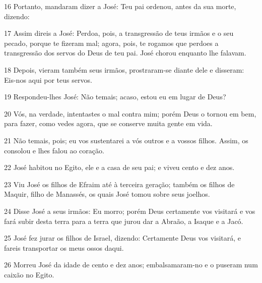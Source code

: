 \par 16 Portanto, mandaram dizer a José: Teu pai ordenou, antes da sua morte, dizendo:
\par 17 Assim direis a José: Perdoa, pois, a transgressão de teus irmãos e o seu pecado, porque te fizeram mal; agora, pois, te rogamos que perdoes a transgressão dos servos do Deus de teu pai. José chorou enquanto lhe falavam.
\par 18 Depois, vieram também seus irmãos, prostraram-se diante dele e disseram: Eis-nos aqui por teus servos.
\par 19 Respondeu-lhes José: Não temais; acaso, estou eu em lugar de Deus?
\par 20 Vós, na verdade, intentastes o mal contra mim; porém Deus o tornou em bem, para fazer, como vedes agora, que se conserve muita gente em vida.
\par 21 Não temais, pois; eu vos sustentarei a vós outros e a vossos filhos. Assim, os consolou e lhes falou ao coração.
\par 22 José habitou no Egito, ele e a casa de seu pai; e viveu cento e dez anos.
\par 23 Viu José os filhos de Efraim até à terceira geração; também os filhos de Maquir, filho de Manassés, os quais José tomou sobre seus joelhos.
\par 24 Disse José a seus irmãos: Eu morro; porém Deus certamente vos visitará e vos fará subir desta terra para a terra que jurou dar a Abraão, a Isaque e a Jacó.
\par 25 José fez jurar os filhos de Israel, dizendo: Certamente Deus vos visitará, e fareis transportar os meus ossos daqui.
\par 26 Morreu José da idade de cento e dez anos; embalsamaram-no e o puseram num caixão no Egito.


